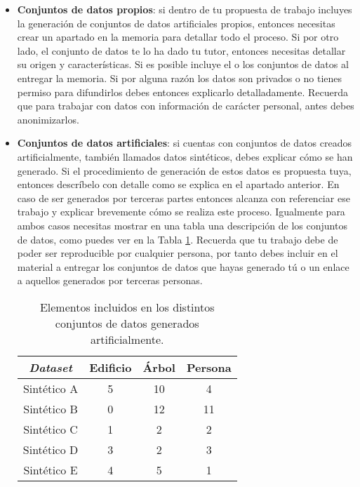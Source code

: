 \begin{itemize}
    \item {\bf Conjuntos de datos propios}: si dentro de tu propuesta de trabajo incluyes la generación de conjuntos de datos artificiales propios, entonces necesitas crear un apartado en la memoria para detallar todo el proceso. Si por otro lado, el conjunto de datos te lo ha dado tu tutor, entonces necesitas detallar su origen y características. Si es posible incluye el o los conjuntos de datos al entregar la memoria. Si por alguna razón los datos son privados o no tienes permiso para difundirlos debes entonces explicarlo detalladamente. Recuerda que para trabajar con datos con información de carácter personal, antes debes anonimizarlos. 
    \item {\bf Conjuntos de datos artificiales}: si cuentas con conjuntos de datos creados artificialmente, también llamados datos sintéticos, debes explicar cómo se han generado. Si el procedimiento de generación de estos datos es propuesta tuya, entonces descríbelo con detalle como se explica en el apartado anterior. En caso de ser generados por terceras partes entonces alcanza con referenciar ese trabajo y explicar brevemente cómo se realiza este proceso. Igualmente para ambos casos necesitas mostrar en una tabla una descripción de los conjuntos de datos, como puedes ver en la Tabla \ref{tab:fake}. Recuerda que tu trabajo debe de poder ser reproducible por cualquier persona, por tanto debes incluir en el material a entregar los conjuntos de datos que hayas generado tú o un enlace a aquellos generados por terceras personas.

\begin{table}[!ht]
\centering
\label{tab:results}
\begin{tabular}{c|ccc}
\hline
{\it \textbf{Dataset}} & \textbf{Edificio} & \textbf{Árbol} & \textbf{Persona} \\
\hline
Sintético A & 5 & 10 & 4 \\
Sintético B & 0 & 12 & 11 \\
Sintético C & 1 & 2 & 2 \\
Sintético D & 3 & 2 & 3 \\
Sintético E & 4 & 5 & 1 \\
\hline
\end{tabular}
\caption{Elementos incluidos en los distintos conjuntos de datos generados artificialmente.\label{tab:fake}}
\end{table}
\end{itemize}

